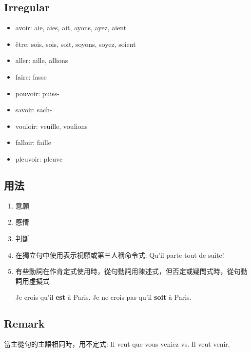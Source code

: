 \documentclass{book}
\begin{document}
        \subsection{Irregular}
            \begin{itemize}
                \item avoir: aie, aies, ait, ayons, ayez, aient
                \item être: sois, sois, soit, soyons, soyez, soient
                \item aller: aille, allions
                \item faire: fasse
                \item pouvoir: puiss-
                \item savoir: sach-
                \item vouloir: veuille, voulions
                \item falloir: faille
                \item pleuvoir: pleuve
            \end{itemize}
        \subsection{用法}
            \begin{enumerate}
                \item 意願
                \item 感情
                \item 判斷
                \item 在獨立句中使用表示祝願或第三人稱命令式: Qu'il parte tout de suite!
                \item 有些動詞在作肯定式使用時，從句動詞用陳述式，但否定或疑問式時，從句動詞用虛擬式
                    \begin{center}
                        Je crois qu'il \textbf{est} à Paris. Je ne crois pas qu'il \textbf{soit} à Paris.
                    \end{center}
            \end{enumerate}
        \subsection{Remark}
            當主從句的主語相同時，用不定式: Il veut que vous veniez vs. Il veut venir.
        
\end{document}
